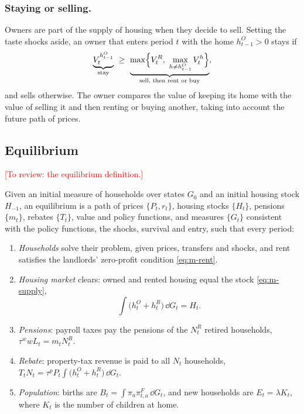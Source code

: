 \subsubsection*{Staying or selling.}
Owners are part of the supply of housing when they decide to
sell. Setting the taste shocks aside, an owner that enters period $t$ with the
home $h^O_{t-1}>0$ stays if
\begin{equation*}
 \underbrace{V^{h^O_{t-1}}_t}_{\text{stay}}\ \ge\
 \underbrace{\max\Bigl\{V^R_t,\ \max_{h\neq h^O_{t-1}}V^h_t\Bigr\}}_{\text{sell, then rent or buy}},
\end{equation*}
and sells otherwise. The owner compares the value of keeping its home with the
value of selling it and then renting or buying another, taking into account
the future path of prices.


\subsection{Equilibrium}
\label{sec:m-equilibrium}

\textcolor{red}{[To review: the equilibrium definition.]}

\begin{definition}
Given an initial measure of households over states $G_0$ and an initial housing stock $H_{-1}$, an equilibrium is
a path of prices $\{P_t,r_t\}$, housing stocks $\{H_t\}$, pensions $\{m_t\}$, rebates $\{T_t\}$, value
and policy functions, and measures $\{G_t\}$ consistent with the policy
functions, the shocks, survival and entry, such that every period:
\begin{enumerate}
\item \emph{Households} solve their problem, given prices, transfers and
shocks, and rent satisfies the landlords' zero-profit condition
\eqref{eq:m-rent}.
\item \emph{Housing market} clears: owned and rented housing equal the stock \eqref{eq:m-supply},
\[
 \int\bigl(h^O_t+h^R_t\bigr)\,\dd G_t=H_t .
\]
\item \emph{Pensions}: payroll taxes pay the pensions of the $N^R_t$ retired
households, $\tau^wwL_t=m_tN^R_t$.
\item \emph{Rebate}: property-tax revenue is paid to all $N_t$ households,
$T_tN_t=\tau^pP_t\int\bigl(h^O_t+h^R_t\bigr)\,\dd G_t$.
\item \emph{Population}: births are $B_t=\int\pi_a\pi^F_{t,a}\,\dd G_t$, and
new households are $E_t=\lambda K_t$, where $K_t$ is the number of children
at home.
\end{enumerate}
\end{definition}

